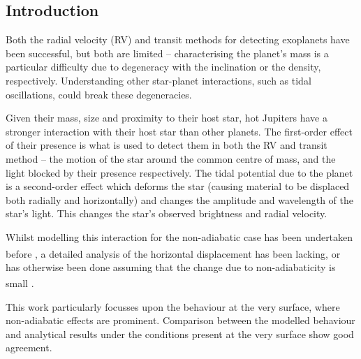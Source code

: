 \documentclass[a0,portrait]{a0poster}
\begin{document}
\begin{multicols}{2}
\begin{tcolorbox}[colframe=black,colback=blue!10!white]
\vspace{0.5cm}

\section*{Introduction}

Both the radial velocity (RV) and transit methods for detecting exoplanets have been successful, but both are limited -- characterising the planet's mass is a particular difficulty due to degeneracy with the inclination or the density, respectively. Understanding other star-planet interactions, such as tidal oscillations, could break these degeneracies.

Given their mass, size and proximity to their host star, hot Jupiters have a stronger interaction with their host star than other planets. The first-order effect of their presence is what is used to detect them in both the RV and transit method -- the motion of the star around the common centre of mass, and the light blocked by their presence respectively. The tidal potential due to the planet is a second-order effect which deforms the star (causing material to be displaced both radially and horizontally) and changes the amplitude and wavelength of the star's light. This changes the star's observed brightness and radial velocity.

Whilst modelling this interaction for the non-adiabatic case has been undertaken before \textsuperscript{\cite{Pfahl2008}}, a detailed analysis of the horizontal displacement has been lacking, or has otherwise been done assuming that the change due to non-adiabaticity is small \textsuperscript{\cite{Terquem1998}}.

This work particularly focusses upon the behaviour at the very surface, where non-adiabatic effects are prominent. Comparison between the modelled behaviour and analytical results under the conditions present at the very surface show good agreement.

\vspace{0.5cm}

\end{tcolorbox}



\color{DarkSlateGray} %

\begin{tcolorbox}[colframe=black,colback=blue!10!white]


\end{tcolorbox}
\end{multicols}
\end{document}
